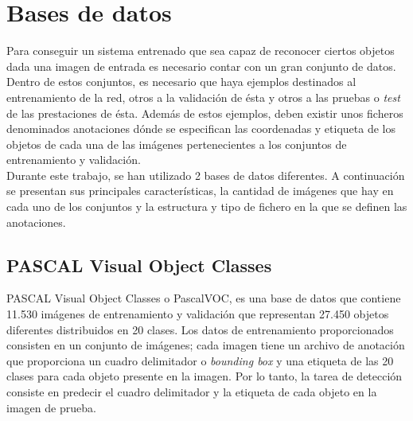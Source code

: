 \documentclass[a4paper, 12pt, spanish, chapterprefix, numbers=noenddot]{book}
\begin{document}
\begin{comment}
\textbf{LMDB} (Lightning Memory-Mapped Database) es una biblioteca de gestión de bases de datos modelada en la API de BerkeleyDB. Toda la base de datos está modelada como un mapa de memoria, y todos los datos recuperados de ella son datos devueltos directamente de la memoria asignada.\\

La biblioteca es totalmente compatible con subprocesos y admite el acceso simultáneo de lectura y escritura desde múltiples procesos o hilos. Las páginas de datos utilizan una estrategia que permite que no se sobreescriban las páginas con datos activos, lo cual brinda además resistencia a la corrupción de la base de datos. Las escrituras están totalmente serializadas, es decir, solo se permite una escritura de forma simultánea. La estructura de la base de datos tiene múltiples versiones para que las lecturas se ejecuten sin bloqueos; las escrituras sobre ésta no bloquean a las lecturas, y las lecturas no bloquean las escrituras.
\end{comment}

\section{Bases de datos}\label{BBDD}

Para conseguir un sistema entrenado que sea capaz de reconocer ciertos objetos dada una imagen de entrada es necesario contar con un gran conjunto de datos. Dentro de estos conjuntos, es necesario que haya ejemplos destinados al entrenamiento de la red, otros a la validación de ésta y otros a las pruebas o \textit{test} de las prestaciones de ésta. Además de estos ejemplos, deben existir unos ficheros denominados anotaciones dónde se especifican las coordenadas y etiqueta de los objetos de cada una de las imágenes pertenecientes a los conjuntos de entrenamiento y validación.\\

Durante este trabajo, se han utilizado 2 bases de datos diferentes. A continuación se presentan sus principales características, la cantidad de imágenes que hay en cada uno de los conjuntos y la estructura y tipo de fichero en la que se definen las anotaciones.

\subsection{PASCAL Visual Object Classes}\label{VOC}

PASCAL Visual Object Classes\cite{PascalVocHome} o PascalVOC, es una base de datos que contiene 11.530 imágenes de entrenamiento y validación que representan 27.450 objetos diferentes distribuidos en 20 clases. Los datos de entrenamiento proporcionados consisten en un conjunto de imágenes; cada imagen tiene un archivo de anotación que proporciona un cuadro delimitador o \textit{bounding box} y una etiqueta de las 20 clases para cada objeto presente en la imagen. Por lo tanto, la tarea de detección consiste en predecir el cuadro delimitador y la etiqueta de cada objeto en la imagen de prueba.\\
\end{document}
